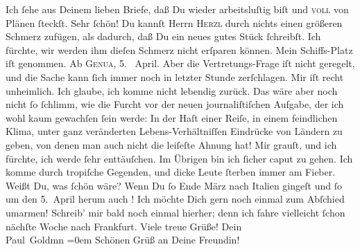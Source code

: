 \begin{ledgroupsized}[t]{13cm}
               Ich ſehe aus Deinem lieben Briefe, daß Du wieder arbeitsluſtig biſt und \textsc{voll} von Plänen ſteckſt. Sehr ſchön! Du kannſt Herrn \textsc{Herzl} durch nichts einen größeren Schmerz zufügen, als dadurch, daß Du ein neues
               gutes Stück ſchreibſt. Ich fürchte, wir werden ihm dieſen Schmerz nicht erſparen
               können.\pend
           \pstart
           Mein Schiffs-Platz iſt
               genommen. Ab \textsc{Genua}, 5.  April.
               Aber die Vertretungs-Frage iſt
               nicht geregelt, und die {\pb}Sache kann ſich immer noch
               in letzter Stunde zerſchlagen.\pend
           \pstart
           Mir iſt recht unheimlich. Ich glaube, ich komme nicht lebendig zurück. Das wäre aber
               noch nicht ſo ſchlimm, wie die Furcht vor der neuen journaliſtiſchen Aufgabe, der ich
                  \strikeout{\textcolor{gray}{w}} wohl kaum gewachſen ſein
               werde: In der Haſt einer Reiſe, in einem feindlichen Klima, unter ganz veränderten
               Lebens-Verhältniſſen Eindrücke von Ländern zu geben, \strikeout{\textcolor{gray}{×}}{ } von denen man auch nicht die
               leiſeſte Ahnung hat! Mir grauſt, und ich fürchte, ich werde ſehr enttäuſchen. Im
               Übrigen bin ich ſicher caput zu gehen. Ich komme durch tropiſche {\pb}Gegenden, und dicke Leute ſterben immer am
               Fieber.\pend
           \pstart
           Weißt Du, was ſchön wäre? Wenn Du ſo  Ende März nach Italien gingeſt und ſo um den 5. April herum
               auch \label{K_L02841-4v}\label{K_L02841-4h}!
               Ich möchte Dich gern noch einmal zum Abſchied umarmen!\pend
           \pstart
           Schreib’ mir bald noch einmal hierher; denn ich fahre vielleicht ſchon nächſte Woche
               nach Frankfurt.\pend
           \pstart
           Viele treue Grüße!\pend
           \pstart
           Dein {\\[\baselineskip]}\spacefill\mbox{Paul Goldmn}\pend
           \leftskip=0em{}\pstart
           \noindent{}Schönen Grüß an Deine Freundin!\pend
           
         
         \endnumbering{}\end{ledgroupsized}  \newcommand{\dateiname}{L02841}\newcommand{\titel}{Paul Goldmann an Arthur Schnitzler, 7. 3. [1898]}\newcommand{\editorInnen}{Martin Anton Müller und Laura Untner}
      